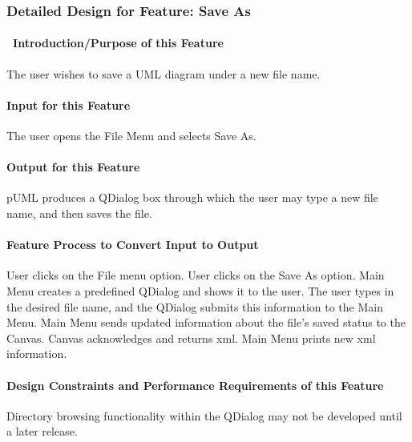 \documentclass[twoside,letterpaper]{article}
\begin{document}
{%
%

\subsubsection{Detailed Design for Feature: Save As }

\paragraph[\ Introduction/Purpose of this Feature]
{\ Introduction/Purpose of this Feature}
{
The user wishes to save a UML diagram under a new file name.
}

\paragraph[Input for this Feature]{Input for this Feature}
{
The user opens the File Menu and selects Save As.
}

\paragraph{Output for this Feature}
{
pUML produces a QDialog box through which the user may type a new file name, and then saves the file.
}

\paragraph{Feature Process to Convert Input to Output}
{
User clicks on the File menu option. User clicks on the Save As option. Main Menu creates a predefined QDialog and shows it to the user. The user types in the desired file name, and the QDialog submits this information to the Main Menu. Main Menu sends updated information about the file{\textquoteright}s saved status to the Canvas. Canvas acknowledges and returns xml.  Main Menu prints new xml information.
}

\paragraph{Design Constraints and Performance Requirements of this Feature}
{
Directory browsing functionality within the QDialog may not be developed until a later release.
}
\bigskip
\bigskip

}
\end{document}
